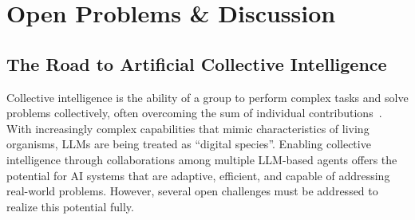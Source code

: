 \documentclass[acmsmall,nonacm]{acmart}
\begin{document}
\section{Open Problems \& Discussion} \label{sec:OpenProblem}


    \subsection{The Road to Artificial Collective Intelligence}
        Collective intelligence is the ability of a group to perform complex tasks and solve problems collectively, often overcoming the sum of individual contributions~\cite{Leimeister2010}. With increasingly complex capabilities that mimic characteristics of living organisms, LLMs are being treated as ``digital species''. Enabling collective intelligence through collaborations among multiple LLM-based agents offers the potential for AI systems that are adaptive, efficient, and capable of addressing real-world problems. However, several open challenges must be addressed to realize this potential fully.
\end{document}
